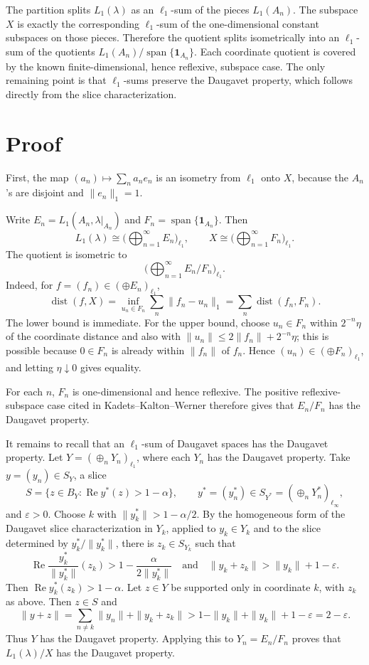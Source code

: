 \documentclass[11pt]{article}
\newcommand{\eps}{\varepsilon}
\begin{document}
The partition splits \(L_1(\lambda)\) as an \(\ell_1\)-sum of the pieces \(L_1(A_n)\).  The subspace \(X\) is exactly the corresponding \(\ell_1\)-sum of the one-dimensional constant subspaces on those pieces.  Therefore the quotient splits isometrically into an \(\ell_1\)-sum of the quotients \(L_1(A_n)/\operatorname{span}\{\mathbf 1_{A_n}\}\).  Each coordinate quotient is covered by the known finite-dimensional, hence reflexive, subspace case.  The only remaining point is that \(\ell_1\)-sums preserve the Daugavet property, which follows directly from the slice characterization.

\section*{Proof}

First, the map \((a_n)\mapsto \sum_n a_ne_n\) is an isometry from \(\ell_1\) onto \(X\), because the \(A_n\)'s are disjoint and \(\|e_n\|_1=1\).

Write \(E_n=L_1(A_n,\lambda|_{A_n})\) and \(F_n=\operatorname{span}\{\mathbf 1_{A_n}\}\).  Then
\[
  L_1(\lambda)\cong \Big(\bigoplus_{n=1}^\infty E_n\Big)_{\ell_1},
  \qquad
  X\cong \Big(\bigoplus_{n=1}^\infty F_n\Big)_{\ell_1}.
\]
The quotient is isometric to
\[
  \Big(\bigoplus_{n=1}^\infty E_n/F_n\Big)_{\ell_1}.
\]
Indeed, for \(f=(f_n)\in(\oplus E_n)_{\ell_1}\),
\[
\operatorname{dist}(f,X)
=
\inf_{u_n\in F_n}\sum_n\|f_n-u_n\|_1
=
\sum_n \operatorname{dist}(f_n,F_n).
\]
The lower bound is immediate.  For the upper bound, choose \(u_n\in F_n\) within \(2^{-n}\eta\) of the coordinate distance and also with \(\|u_n\|\leq 2\|f_n\|+2^{-n}\eta\); this is possible because \(0\in F_n\) is already within \(\|f_n\|\) of \(f_n\).  Hence \((u_n)\in(\oplus F_n)_{\ell_1}\), and letting \(\eta\downarrow0\) gives equality.

For each \(n\), \(F_n\) is one-dimensional and hence reflexive.  The positive reflexive-subspace case cited in Kadets--Kalton--Werner therefore gives that \(E_n/F_n\) has the Daugavet property.

It remains to recall that an \(\ell_1\)-sum of Daugavet spaces has the Daugavet property.  Let \(Y=(\oplus_n Y_n)_{\ell_1}\), where each \(Y_n\) has the Daugavet property.  Take \(y=(y_n)\in S_Y\), a slice
\[
  S=\{z\in B_Y:\operatorname{Re} y^*(z)>1-\alpha\},
  \qquad y^*=(y_n^*)\in S_{Y^*}=(\oplus_n Y_n^*)_{\ell_\infty},
\]
and \(\eps>0\).  Choose \(k\) with \(\|y_k^*\|>1-\alpha/2\).  By the homogeneous form of the Daugavet slice characterization in \(Y_k\), applied to \(y_k\in Y_k\) and to the slice determined by \(y_k^*/\|y_k^*\|\), there is \(z_k\in S_{Y_k}\) such that
\[
  \operatorname{Re} \frac{y_k^*}{\|y_k^*\|}(z_k)>1-\frac{\alpha}{2\|y_k^*\|}
  \quad\text{and}\quad
  \|y_k+z_k\|>\|y_k\|+1-\eps.
\]
Then \(\operatorname{Re}y_k^*(z_k)>1-\alpha\).
Let \(z\in Y\) be supported only in coordinate \(k\), with \(z_k\) as above.  Then \(z\in S\) and
\[
  \|y+z\|
  =
  \sum_{n\neq k}\|y_n\|+\|y_k+z_k\|
  >
  1-\|y_k\|+\|y_k\|+1-\eps
  =
  2-\eps.
\]
Thus \(Y\) has the Daugavet property.  Applying this to \(Y_n=E_n/F_n\) proves that \(L_1(\lambda)/X\) has the Daugavet property.
\end{document}
